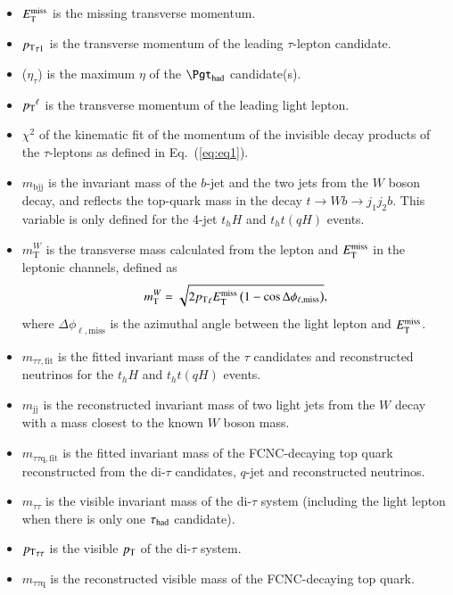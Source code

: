 \begin{itemize}
\item $E_{\text{T}}^{\text{miss}}$ is the missing transverse momentum.
\item ${p_{\text{T}}}_{\tau1} $ is the transverse momentum of the leading $\tau$-lepton candidate.
\item {}($\eta_{\tau}$) is the maximum $\eta$ of the $\tauhad$ candidate(s). 
\item ${p_{\text{T}}}^{\ell}$ is the transverse momentum of the leading light lepton.
\item $\chi^2$ of the kinematic fit of the momentum of the invisible decay products of the $\tau$-leptons as defined in Eq.~(\ref{eq:eq1}).
\item $m_{\text{bjj}}$ is the invariant mass of the $b$-jet and the two jets from the $W$ boson decay, and reflects the top-quark mass in the decay $t\to Wb \to j_1j_2b$. This variable is only defined for the 4-jet $t_hH$ and $t_ht(qH)$ events.
\item $m^{W}_{\text{T}}$ is the transverse mass calculated from the lepton and $E_{\text{T}}^{\text{miss}}$ in the leptonic channels, defined as
\begin{equation*}
m^{W}_{\text{T}} = \sqrt{2 {p_{\text{T}}}_{\ell} E_{\text{T}}^{\text{miss}} \left(1-\cos\Delta\phi_{\ell,\text{miss}} \right)},  
\end{equation*}
where $\Delta\phi_{\ell,\text{miss}}$ is the azimuthal angle between the light lepton and $E_{\text{T}}^{\text{miss}}$.  
\item $m_{\tau\tau,\text{fit}}$ is the fitted invariant mass of the $\tau$ candidates and reconstructed neutrinos for the $t_hH$ and $t_ht(qH)$ events. 
\item $m_{\text{jj}}$ is the reconstructed invariant mass of two light jets from the $W$ decay with a mass closest to the known $W$ boson mass.
\item $m_{\tau\tau\text{q},\text{fit}}$ is the fitted invariant mass of the FCNC-decaying top quark reconstructed from the di-$\tau$ candidates, $q$-jet and reconstructed neutrinos.
\item $m_{\tau\tau}$ is the visible invariant mass of the di-$\tau$ system (including the light lepton when there is only one $\tau_{\mathrm{had}}$ candidate).
\item ${p_{\text{T}}}_{\tau\tau}$ is the visible $p_{\text{T}}$ of the di-$\tau$ system.
\item $m_{\tau\tau\text{q}}$ is the reconstructed visible mass of the FCNC-decaying top quark.

\end{itemize}
